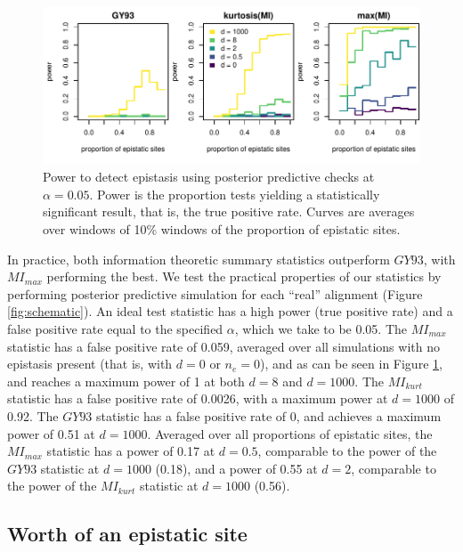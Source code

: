 \documentclass[11pt]{article}
\begin{document}
\begin{figure}
  \centering
  \includegraphics[width=\textwidth]{figures/power_curves.pdf}
  \caption{
  Power to detect epistasis using posterior predictive checks at $\alpha = 0.05$.
  Power is the proportion tests yielding a statistically significant result, that is, the true positive rate.
  Curves are averages over windows of 10\% windows of the proportion of epistatic sites.
  }
  \label{fig:power_curves}
\end{figure}

In practice, both information theoretic summary statistics outperform $GY93$, with $MI_{max}$ performing the best.
We test the practical properties of our statistics by performing posterior predictive simulation for each ``real'' alignment (Figure \ref{fig:schematic}).
An ideal test statistic has a high power (true positive rate) and a false positive rate equal to the specified $\alpha$, which we take to be 0.05.
The $MI_{max}$ statistic has a false positive rate of 0.059, averaged over all simulations with no epistasis present (that is, with $d = 0$ or $n_e = 0$), and as can be seen in Figure \ref{fig:power_curves}, and reaches a maximum power of 1 at both $d = 8$ and $d = 1000$.
The $MI_{kurt}$ statistic has a false positive rate of 0.0026, with a maximum power at $d = 1000$ of 0.92.
The $GY93$ statistic has a false positive rate of 0, and achieves a maximum power of 0.51 at $d = 1000$.
Averaged over all proportions of epistatic sites, the $MI_{max}$ statistic has a power of 0.17 at $d = 0.5$, comparable to the power of the $GY93$ statistic at $d = 1000$ (0.18), and a power of 0.55 at $d = 2$, comparable to the power of the $MI_{kurt}$ statistic at $d = 1000$ (0.56).

\subsection*{Worth of an epistatic site}
\end{document}
